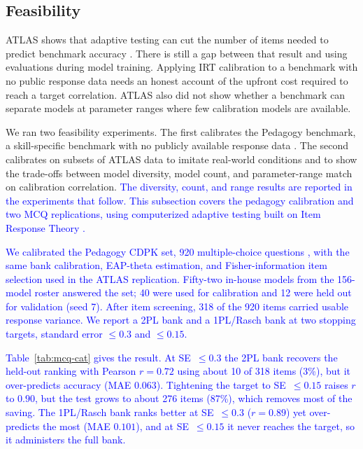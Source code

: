 \providecommand{\aiadd}[1]{\textcolor{blue}{#1}}
\providecommand{\aibullets}[1]{{\color{blue}#1}}


\subsection{Feasibility}

ATLAS shows that adaptive testing can cut the number of items needed to
predict benchmark accuracy \cite{li2025atlas}. There is still a gap between
that result and using evaluations during model training. Applying IRT
calibration to a benchmark with no public response data needs an honest
account of the upfront cost required to reach a target correlation. ATLAS
also did not show whether a benchmark can separate models at parameter
ranges where few calibration models are available.

We ran two feasibility experiments. The first calibrates the Pedagogy
benchmark, a skill-specific benchmark with no publicly available response
data \cite{lelievre2025pedagogy}. The second calibrates on subsets of ATLAS
data to imitate real-world conditions and to show the trade-offs between
model diversity, model count, and parameter-range match on calibration
correlation. \aiadd{The diversity, count, and range results are reported in
the experiments that follow. This subsection covers the pedagogy calibration
and two MCQ replications, using computerized adaptive testing built on Item
Response Theory \cite{lord1980irt,embretson2000irt}.}

\aiadd{We calibrated the Pedagogy CDPK set, 920 multiple-choice questions
\cite{lelievre2025pedagogy}, with the same bank calibration, EAP-theta
estimation, and Fisher-information item selection used in the ATLAS
replication. Fifty-two in-house models from the 156-model roster answered the
set; 40 were used for calibration and 12 were held out for validation (seed
7). After item screening, 318 of the 920 items carried usable response
variance. We report a 2PL bank and a 1PL/Rasch bank \cite{rasch1960} at two
stopping targets, standard error $\le 0.3$ and $\le 0.15$.}

\aiadd{Table~\ref{tab:mcq-cat} gives the result. At SE~$\le 0.3$ the 2PL bank
recovers the held-out ranking with Pearson $r = 0.72$ using about 10 of 318
items (3\%), but it over-predicts accuracy (MAE $0.063$). Tightening the
target to SE~$\le 0.15$ raises $r$ to $0.90$, but the test grows to about 276
items (87\%), which removes most of the saving. The 1PL/Rasch bank ranks
better at SE~$\le 0.3$ ($r = 0.89$) yet over-predicts the most (MAE $0.101$),
and at SE~$\le 0.15$ it never reaches the target, so it administers the full
bank.}

